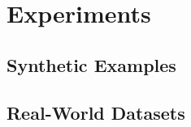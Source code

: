 \documentclass[12pt]{article}
\begin{document}
\section{Experiments}

\subsection{Synthetic Examples}

\subsection{Real-World Datasets}




\end{document}
